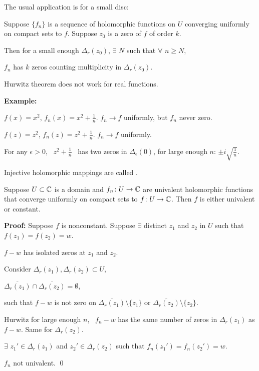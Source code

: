 \documentclass[10pt,aspectratio=169]{beamer}
\begin{document}
\begin{frame}
The usual application is for a small disc:

\medskip
\pause

Suppose $\{ f_n \}$ is a sequence of holomorphic
functions on $U$ converging uniformly
on compact sets to $f$.
\pause
Suppose $z_0$ is a zero of
$f$ of order $k$.

\medskip
\pause
Then for a small enough $\Delta_r(z_0)$,
$\exists$ $N$ such that
$\forall$ $n \geq N$,

$f_n$ has $k$ zeros counting multiplicity in
$\Delta_r(z_0)$.

\bigskip
\pause

Hurwitz theorem does not work for real functions.

\medskip
\pause

\textbf{Example:}

$f(x) = x^2$, \quad $f_n(x) = x^2+\frac{1}{n}$.  \quad $f_n \to f$ uniformly, but
$f_n$ never zero.

\medskip
\pause

$f(z) = z^2$, \quad $f_n(z) = z^2+\frac{1}{n}$.  \quad $f_n \to f$ uniformly.

\pause
\medskip

For any $\epsilon > 0$, ~$z^2+\frac{1}{n}$~ has
two zeros in $\Delta_\epsilon(0)$, for large enough $n$:
\quad
$\pm i \sqrt{\frac{1}{n}}$.
\end{frame}

\begin{frame}
Injective holomorphic
mappings are called \emph{}.

\pause

\begin{corollary}
Suppose $U \subset {\mathbb{C}}$ is a domain and $f_n \colon U \to {\mathbb{C}}$ are
univalent holomorphic functions that converge uniformly on compact sets
to $f \colon U \to {\mathbb{C}}$.  Then $f$ is either univalent or constant.
\end{corollary}

\pause
\textbf{Proof:}
Suppose $f$ is nonconstant.
\pause
Suppose $\exists$ distinct $z_1$ and $z_2$ in $U$ such that $f(z_1) =
f(z_2) = w$.

\pause
\medskip

$f-w$ has isolated zeros at $z_1$ and $z_2$.

\medskip
\pause
Consider $\Delta_r(z_1),\Delta_r(z_2) \subset U$,

\pause
$\overline{\Delta_r(z_1)} \cap \overline{\Delta_r(z_2)} = \emptyset$,

\pause 
such that $f-w$ is not zero on
$\overline{\Delta_r(z_1)} \setminus \{ z_1 \}$ or
$\overline{\Delta_r(z_2)} \setminus \{ z_2 \}$.

\medskip
\pause

Hurwitz \wthus for large enough $n$, ~$f_n-w$ has the same number of
zeros in $\Delta_r(z_1)$ as $f-w$. \pause Same for $\Delta_r(z_2)$.

\pause
\medskip
\thus \quad $\exists$ $z_1' \in \Delta_r(z_1)$ and
$z_2' \in \Delta_r(z_2)$ such that $f_n(z_1')=f_n(z_2')=w$.

\pause
\medskip

\thus \quad
$f_n$ not univalent. \qed
\end{frame}
\end{document}
